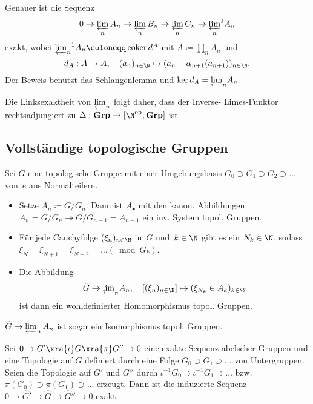 \documentclass{cheat-sheet}
\DeclareMathOperator{\coker}{coker} %
\newcommand{\Grp}{\mathbf{Grp}} %
\newcommand{\op}{\mathrm{op}} %
\newcommand{\thra}{\twoheadrightarrow}
\begin{document}
\begin{bem}
  Genauer ist die Sequenz
  \[
    0 \to \varprojlim_n A_n \to \varprojlim_n B_n \to \varprojlim_n C_n \to {\varprojlim_n}^1 A_n
  \]
  exakt, wobei ${\varprojlim_n}^1 A_n \coloneqq \coker d^A$ mit $A \coloneqq \prod_n A_n$ und
  \[
    d_A : A \to A, \quad
    (a_n)_{n \in \N} \mapsto (a_n - \alpha_{n+1}(a_{n+1}))_{n \in \N}.
  \]
  Der Beweis benutzt das Schlangenlemma und $\ker d_A = {\varprojlim}_n A_n$.
\end{bem}

\begin{bem}
  Die Linksexaktheit von ${\varprojlim}_n$ folgt daher, dass der Inverse- Limes-Funktor rechtsadjungiert zu $\Delta : \Grp \to [\N^\op, \Grp]$ ist.
\end{bem}

\subsection{Vollständige topologische Gruppen}

\begin{konstr}
  Sei $G$ eine topologische Gruppe mit einer Umgebungsbasis $G_0 \supset G_1 \supset G_2 \supset \ldots$ von~$e$ aus Normalteilern.
  \begin{itemize}
    \item Setze $A_n \coloneqq G/G_n$.
    Dann ist $A_\bullet$ mit den kanon. Abbildungen $A_n = G / G_n \thra G / G_{n-1} = A_{n-1}$ ein inv. System topol. Gruppen.
    \item Für jede Cauchyfolge $(\xi_n)_{n \in \N}$ in~$G$ und~$k \in \N$ gibt es ein $N_k \in \N$, sodass $\xi_N = \xi_{N+1} = \xi_{N+2} = \ldots (\bmod{G_k})$.
    \item Die Abbildung
    \[
      \hat{G} \to {\varprojlim}_{n} A_n, \quad
      [(\xi_n)_{n \in \N}] \mapsto (\xi_{N_k} \in A_k)_{k \in \N}
    \]
    ist dann ein wohldefinierter Homomorphismus topol. Gruppen.
  \end{itemize}
\end{konstr}

\begin{prop}
  $\hat{G} \to \varprojlim_{n} A_n$ \enspace
  ist sogar ein Isomorphismus topol. Gruppen.
\end{prop}


\begin{satz}
  Sei $0 \to G' \xra{\iota} G \xra{\pi} G'' \to 0$ eine exakte Sequenz abelscher Gruppen und eine Topologie auf $G$ definiert durch eine Folge $G_0 \supset G_1 \supset \ldots$ von Untergruppen.
  Seien die Topologie auf $G'$ und $G''$ durch $\iota^{-1} G_0 \supset \iota^{-1} G_1 \supset \ldots$ bzw. $\pi(G_0) \supset \pi(G_1) \supset \ldots$ erzeugt.
  Dann ist die induzierte Sequenz $0 \to \hat{G}' \to \hat{G} \to \hat{G}'' \to 0$ exakt.
\end{satz}
\end{document}
